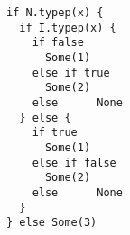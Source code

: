 \begin{lstlisting}[style=scalaioScala]
if N.typep(x) {
  if I.typep(x) {
    if false
      Some(1)
    else if true
      Some(2)
    else      None
  } else {
    if true
      Some(1)
    else if false
      Some(2)
    else      None
  }
} else Some(3)
\end{lstlisting}
